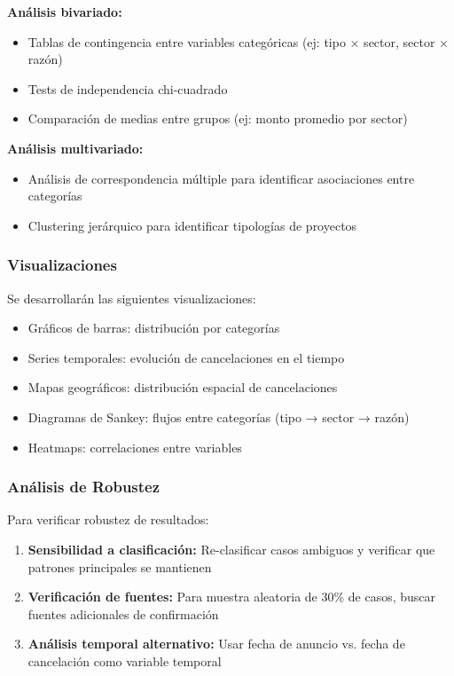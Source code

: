 \documentclass[12pt]{article}
\begin{document}
\textbf{Análisis bivariado:}
\begin{itemize}
    \item Tablas de contingencia entre variables categóricas (ej: tipo × sector, sector × razón)
    \item Tests de independencia chi-cuadrado
    \item Comparación de medias entre grupos (ej: monto promedio por sector)
\end{itemize}

\textbf{Análisis multivariado:}
\begin{itemize}
    \item Análisis de correspondencia múltiple para identificar asociaciones entre categorías
    \item Clustering jerárquico para identificar tipologías de proyectos
\end{itemize}

\subsubsection{Visualizaciones}

Se desarrollarán las siguientes visualizaciones:
\begin{itemize}
    \item Gráficos de barras: distribución por categorías
    \item Series temporales: evolución de cancelaciones en el tiempo
    \item Mapas geográficos: distribución espacial de cancelaciones
    \item Diagramas de Sankey: flujos entre categorías (tipo → sector → razón)
    \item Heatmaps: correlaciones entre variables
\end{itemize}

\subsubsection{Análisis de Robustez}

Para verificar robustez de resultados:
\begin{enumerate}
    \item \textbf{Sensibilidad a clasificación:} Re-clasificar casos ambiguos y verificar que patrones principales se mantienen
    \item \textbf{Verificación de fuentes:} Para muestra aleatoria de 30\% de casos, buscar fuentes adicionales de confirmación
    \item \textbf{Análisis temporal alternativo:} Usar fecha de anuncio vs. fecha de cancelación como variable temporal
\end{enumerate}
\end{document}
